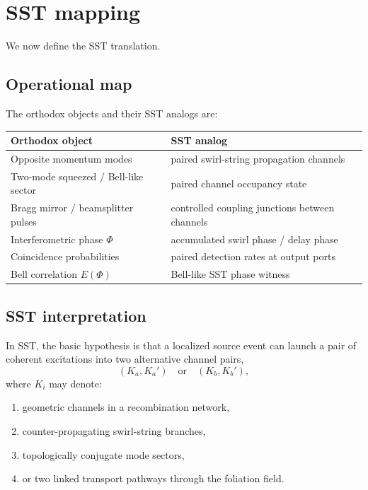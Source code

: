 \documentclass[11pt]{article}
\begin{document}
    \section{SST mapping}
        
        We now define the SST translation.
        
        \subsection{Operational map}
            
            The orthodox objects and their SST analogs are:
            
            \begin{center}
                \begin{tabular}{ll}
                    Orthodox object & SST analog \\ \hline
                    Opposite momentum modes & paired swirl-string propagation channels \\
                    Two-mode squeezed / Bell-like sector & paired channel occupancy state \\
                    Bragg mirror / beamsplitter pulses & controlled coupling junctions between channels \\
                    Interferometric phase \(\Phi\) & accumulated swirl phase / delay phase \\
                    Coincidence probabilities & paired detection rates at output ports \\
                    Bell correlation \(E(\Phi)\) & Bell-like SST phase witness \\
                \end{tabular}
            \end{center}
        
        \subsection{SST interpretation}
            
            In SST, the basic hypothesis is that a localized source event can launch a pair of coherent excitations into two alternative channel pairs,
            \[
                (K_a,K_a') \quad \text{or} \quad (K_b,K_b'),
            \]
            where \(K_i\) may denote:
            \begin{enumerate}[label=(\alph*)]
\item geometric channels in a recombination network,
\item counter-propagating swirl-string branches,
\item topologically conjugate mode sectors,
\item or two linked transport pathways through the foliation field.
            \end{enumerate}
            
\end{document}
